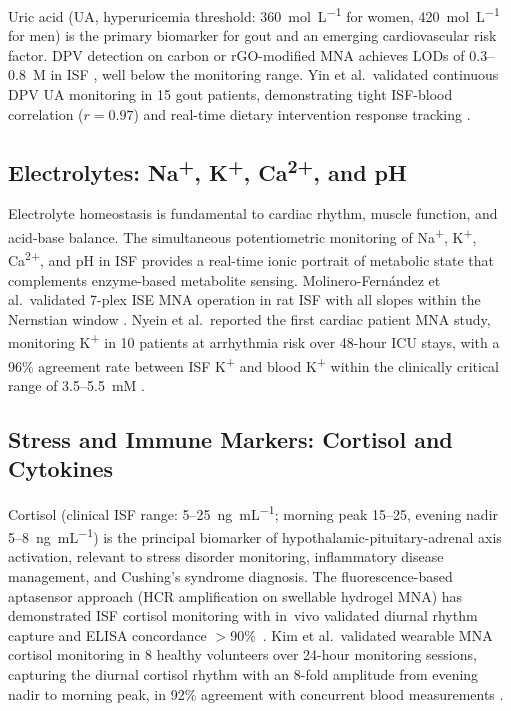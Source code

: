 \documentclass[review,1p]{elsarticle}
\begin{document}
Uric acid (UA, hyperuricemia threshold: 360~\textmu{}mol~L\textsuperscript{$-1$} for women, 420~\textmu{}mol~L\textsuperscript{$-1$} for men) is the primary biomarker for gout and an emerging cardiovascular risk factor. DPV detection on carbon or rGO-modified MNA achieves LODs of 0.3--0.8~\textmu{}M in ISF \cite{Zhu2022UA, Wang2023rGO, Yin2023UA}, well below the monitoring range. Yin et al.\ validated continuous DPV UA monitoring in 15 gout patients, demonstrating tight ISF-blood correlation ($r = 0.97$) and real-time dietary intervention response tracking \cite{Yin2023UA}.

\subsection{Electrolytes: Na\textsuperscript{+}, K\textsuperscript{+}, Ca\textsuperscript{2+}, and pH}
\label{subsec:electrolytes}

Electrolyte homeostasis is fundamental to cardiac rhythm, muscle function, and acid-base balance. The simultaneous potentiometric monitoring of Na\textsuperscript{+}, K\textsuperscript{+}, Ca\textsuperscript{2+}, and pH in ISF provides a real-time ionic portrait of metabolic state that complements enzyme-based metabolite sensing. Molinero-Fern\'{a}ndez et al.\ validated 7-plex ISE MNA operation in rat ISF with all slopes within the Nernstian window \cite{MolineroFernandez2023}. Nyein et al.\ reported the first cardiac patient MNA study, monitoring K\textsuperscript{+} in 10 patients at arrhythmia risk over 48-hour ICU stays, with a 96\% agreement rate between ISF K\textsuperscript{+} and blood K\textsuperscript{+} within the clinically critical range of 3.5--5.5~mM \cite{Nyein2024Cardiac}.

\subsection{Stress and Immune Markers: Cortisol and Cytokines}
\label{subsec:stress}

Cortisol (clinical ISF range: 5--25~ng~mL\textsuperscript{$-1$}; morning peak 15--25, evening nadir 5--8~ng~mL\textsuperscript{$-1$}) is the principal biomarker of hypothalamic-pituitary-adrenal axis activation, relevant to stress disorder monitoring, inflammatory disease management, and Cushing's syndrome diagnosis. The fluorescence-based aptasensor approach (HCR amplification on swellable hydrogel MNA) has demonstrated ISF cortisol monitoring with in~vivo validated diurnal rhythm capture and ELISA concordance $>$90\%~\cite{Zhou2025Cortisol}. Kim et al.\ validated wearable MNA cortisol monitoring in 8 healthy volunteers over 24-hour monitoring sessions, capturing the diurnal cortisol rhythm with an 8-fold amplitude from evening nadir to morning peak, in 92\% agreement with concurrent blood measurements \cite{Kim2024Cortisol}.
\end{document}

